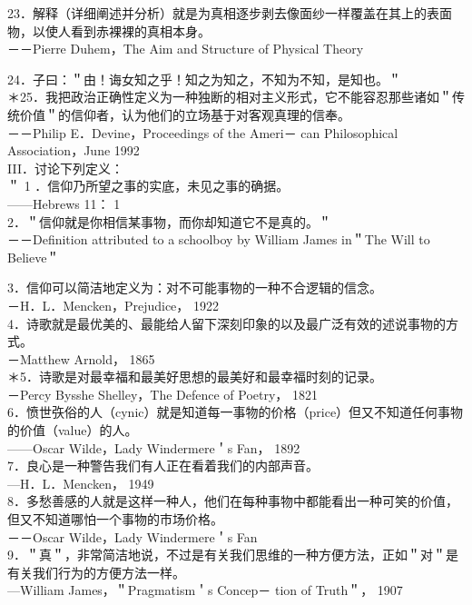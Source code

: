 23．解释（详细阐述并分析）就是为真相逐步剥去像面纱一样覆盖在其上的表面物，以使人看到赤裸裸的真相本身。\\
－－Pierre Duhem，The Aim and Structure of Physical Theory

24．子曰：＂由！诲女知之乎！知之为知之，不知为不知，是知也。＂\\
＊25．我把政治正确性定义为一种独断的相对主义形式，它不能容忍那些诸如＂传统价值＂的信仰者，认为他们的立场基于对客观真理的信奉。\\
－－Philip E．Devine，Proceedings of the Ameri－ can Philosophical Association，June 1992\\
III．讨论下列定义：\\
＂ 1 ．信仰乃所望之事的实底，未见之事的确据。\\
——Hebrews 11： 1\\
2．＂信仰就是你相信某事物，而你却知道它不是真的。＂\\
－－Definition attributed to a schoolboy by William James in＂The Will to Believe＂

3．信仰可以简洁地定义为：对不可能事物的一种不合逻辑的信念。\\
－H．L．Mencken，Prejudice， 1922\\
4．诗歌就是最优美的、最能给人留下深刻印象的以及最广泛有效的述说事物的方式。\\
－Matthew Arnold， 1865\\
＊5．诗歌是对最幸福和最美好思想的最美好和最幸福时刻的记录。\\
－Percy Bysshe Shelley，The Defence of Poetry， 1821\\
6．愤世矤俗的人（cynic）就是知道每一事物的价格（price）但又不知道任何事物的价值（value）的人。\\
——Oscar Wilde，Lady Windermere＇s Fan， 1892\\
7．良心是一种警告我们有人正在看着我们的内部声音。\\
—H．L．Mencken， 1949\\
8．多愁善感的人就是这样一种人，他们在每种事物中都能看出一种可笑的价值，但又不知道哪怕一个事物的市场价格。\\
－－Oscar Wilde，Lady Windermere＇s Fan\\
9．＂真＂，非常简洁地说，不过是有关我们思维的一种方便方法，正如＂对＂是有关我们行为的方便方法一样。\\
—William James，＂Pragmatism＇s Concep－ tion of Truth＂， 1907

